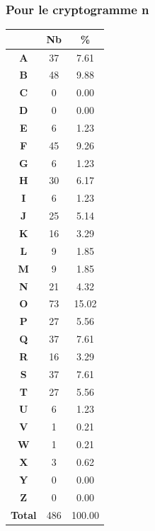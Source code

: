 \documentclass[a4paper, titlepage]{livret}
\begin{document}
\subsubsection{Pour le cryptogramme n}

\begin{minipage}[c]{.3\linewidth}
  \begin{tabular}{|c|c|c|}
    \hline
	& \textbf{Nb} & \textbf{\%}\\
	\hline
	\textbf{A} &      37 &  7.61\\
	\hline
	\textbf{B} &      48 &  9.88\\
	\hline
	\textbf{C} &       0 &  0.00\\
	\hline
	\textbf{D} &       0 &  0.00\\
	\hline
	\textbf{E} &       6 &  1.23\\
	\hline
	\textbf{F} &      45 &  9.26\\
	\hline
	\textbf{G} &       6 &  1.23\\
	\hline
	\textbf{H} &      30 &  6.17\\
	\hline
	\textbf{I} &       6 &  1.23\\
	\hline
	\textbf{J} &      25 &  5.14\\
	\hline
	\textbf{K} &      16 &  3.29\\
	\hline
	\textbf{L} &       9 &  1.85\\
	\hline
	\textbf{M} &       9 &  1.85\\
	\hline
	\textbf{N} &      21 &  4.32\\
	\hline
	\textbf{O} &      73 &  15.02\\
	\hline
	\textbf{P} &      27 &  5.56\\
	\hline
	\textbf{Q} &      37 &  7.61\\
	\hline
	\textbf{R} &      16 &  3.29\\
	\hline
	\textbf{S} &      37 &  7.61\\
	\hline
	\textbf{T} &      27 &  5.56\\
	\hline
	\textbf{U} &       6 &  1.23\\
	\hline
	\textbf{V} &       1 &  0.21\\
	\hline
	\textbf{W} &       1 &  0.21\\
	\hline
	\textbf{X} &       3 &  0.62\\
	\hline
	\textbf{Y} &       0 &  0.00\\
	\hline
	\textbf{Z} &       0 &  0.00\\
	\hline
	\textbf{Total} &     486 &  100.00\\
	\hline
  \end{tabular}
  \label{tab14}
  \end{minipage}
\end{document}
